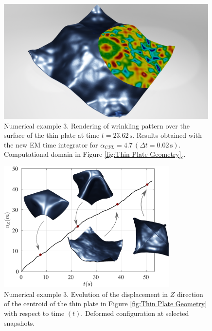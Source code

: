 %

\begin{figure}[hbtp]
	\centering
	\includegraphics[width=0.99\textwidth]{Figures/Example2/individual4}
	\caption{Numerical example 3. Rendering of wrinkling pattern over the surface of the thin plate at time $t=23.62\,\text{s}$. Results obtained with the new EM time integrator for $\alpha_{CFL}=4.7\,(\Delta t = 0.02\,\text{s})$. Computational domain in Figure \ref{fig:Thin Plate Geometry}$_c$.}
	\label{fig:wrinkles zoom}
\end{figure}


\begin{figure}[hbtp]
	\centering
	\includegraphics[width=0.8\textwidth]{Figures/Example2/SolidColor/Evolution.eps}
	\caption{Numerical example 3. Evolution of the displacement in $Z$ direction of the centroid of the thin plate in Figure \ref{fig:Thin Plate Geometry} with respect to time $(t)$. Deformed configuration at selected snapshots.}
	\label{fig:Thin Plate z evolution}
\end{figure}





